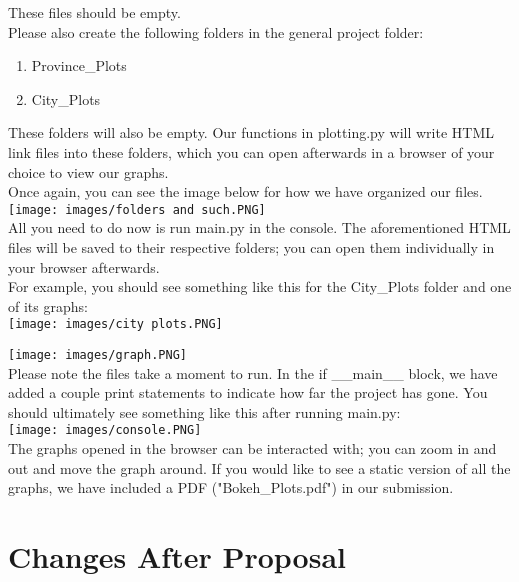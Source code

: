 \documentclass[fontsize=11pt]{article}
\begin{document}
These files should be empty. \\

Please also create the following folders in the general project folder:
\begin{enumerate}
    \item{Province\_Plots}
    \item{City\_Plots}
\end{enumerate}

These folders will also be empty. Our functions in plotting.py will write HTML link files into these folders, which you can open afterwards in a browser of your choice to view our graphs.\\

Once again, you can see the image below for how we have organized our files. \\

\texttt{[image: images/folders and such.PNG]}\\

All you need to do now is run main.py in the console. The aforementioned HTML files will be saved to their respective folders; you can open them individually in your browser afterwards.\\

For example, you should see something like this for the City\_Plots folder and one of its graphs: \\

\texttt{[image: images/city plots.PNG]}

\texttt{[image: images/graph.PNG]} \\

Please note the files take a moment to run. In the if \_\_main\_\_ block, we have added a couple print statements to indicate how far the project has gone. You should ultimately see something like this after running main.py: \\

\texttt{[image: images/console.PNG]}\\

The graphs opened in the browser can be interacted with; you can zoom in and out and move the graph around. If you would like to see a static version of all the graphs, we have included a PDF ("Bokeh\_Plots.pdf") in our submission.

\newpage

\section{Changes After Proposal}
\end{document}
